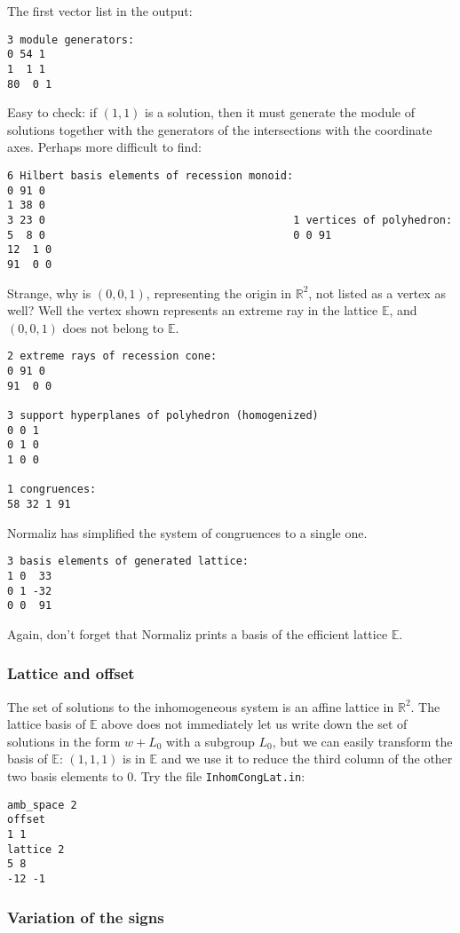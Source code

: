 \documentclass[12pt,a4paper]{scrartcl}
\theoremstyle{definition}
\def\RR{{\mathbb R}}
\def\EE{{\mathbb E}}
\begin{document}
The first vector list in the output:

\begin{Verbatim}
3 module generators:
0 54 1
1  1 1
80  0 1
\end{Verbatim}
Easy to check: if $(1,1)$ is a solution, then it must generate the module of solutions together with the generators of the intersections with the coordinate axes. Perhaps more difficult to find: 
\begin{Verbatim}
6 Hilbert basis elements of recession monoid:
0 91 0
1 38 0
3 23 0                                       1 vertices of polyhedron:
5  8 0                                       0 0 91
12  1 0
91  0 0
\end{Verbatim}
Strange, why is $(0,0,1)$, representing the origin in $\RR^2$, not listed as a vertex as well?
Well the vertex shown represents an extreme ray in the lattice $\EE$, and $(0,0,1)$ does not belong to $\EE$.

\begin{Verbatim}
2 extreme rays of recession cone:
0 91 0
91  0 0

3 support hyperplanes of polyhedron (homogenized)
0 0 1
0 1 0
1 0 0

1 congruences:
58 32 1 91
\end{Verbatim}
Normaliz has simplified the system of congruences to a single one.
\begin{Verbatim}
3 basis elements of generated lattice:
1 0  33
0 1 -32
0 0  91
\end{Verbatim}
Again, don't forget that Normaliz prints a basis of the efficient lattice $\EE$.

\subsubsection{Lattice and offset}\label{offset_ex}

The set of solutions to the inhomogeneous system is an affine lattice in $\RR^2$. The lattice basis of $\EE$ above does not immediately let us write down the set of solutions in the form $w+L_0$ with a subgroup $L_0$, but we can easily transform the basis of $\EE$: $(1,1,1)$ is in $\EE$ and we use it to reduce the third column of the other two basis elements to $0$. Try the file \verb|InhomCongLat.in|:

\begin{Verbatim}
amb_space 2
offset
1 1
lattice 2
5 8
-12 -1
\end{Verbatim}


\subsubsection{Variation of the signs}\label{sign_ex}
\end{document}
